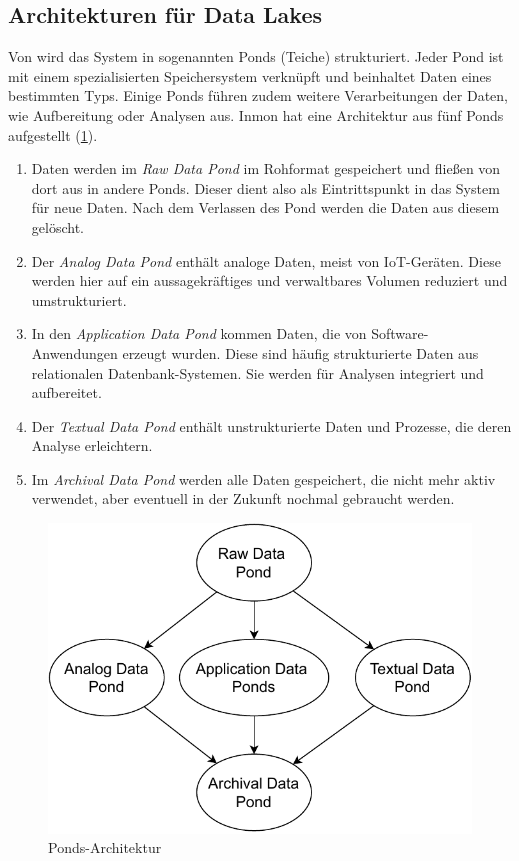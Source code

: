 \subsection{Architekturen für Data Lakes}
Von \textcite{inmon2016data} wird das System in sogenannten Ponds (Teiche) strukturiert.
Jeder Pond ist mit einem spezialisierten Speichersystem verknüpft und beinhaltet Daten eines bestimmten Typs.
Einige Ponds führen zudem weitere Verarbeitungen der Daten, wie Aufbereitung oder Analysen aus.
Inmon hat eine Architektur aus fünf Ponds aufgestellt (\cref{fig:datalake-ponds}).
\begin{enumerate}
    \item Daten werden im \emph{Raw Data Pond} im Rohformat gespeichert und fließen von dort aus in andere Ponds.
          Dieser dient also als Eintrittspunkt in das System für neue Daten.
          Nach dem Verlassen des Pond werden die Daten aus diesem gelöscht.
    \item Der \emph{Analog Data Pond} enthält analoge Daten, meist von IoT-Geräten.
          Diese werden hier auf ein aussagekräftiges und verwaltbares Volumen reduziert und umstrukturiert.
    \item In den \emph{Application Data Pond} kommen Daten, die von Software-Anwendungen erzeugt wurden.
          Diese sind häufig strukturierte Daten aus relationalen Daten\-bank-Systemen.
          Sie werden für Analysen integriert und aufbereitet.
    \item Der \emph{Textual Data Pond} enthält unstrukturierte Daten und Prozesse, die deren Analyse erleichtern.
    \item Im \emph{Archival Data Pond} werden alle Daten gespeichert, die nicht mehr aktiv verwendet, aber eventuell in der Zukunft nochmal gebraucht werden.
\end{enumerate}
\begin{figure}
    \centering
    \includegraphics[width=.8\textwidth]{Grafiken/Grundlagen-Ponds.pdf}
    \caption{Ponds-Architektur \parencite[nach: ][S. 27]{inmon2016data}}
    \label{fig:datalake-ponds}
\end{figure}

